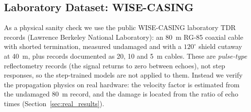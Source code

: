\subsection{Laboratory Dataset: WISE-CASING}
As a physical sanity check we use the public WISE-CASING laboratory TDR records \cite{nrel_wise_casing} (Lawrence Berkeley National Laboratory): an 80~m RG-85 coaxial cable with shorted termination, measured undamaged and with a $120^\circ$ shield cutaway at 40~m, plus records documented as 20, 10 and 5~m cables. These are \emph{pulse-type} reflectometry records (the signal returns to zero between echoes), not step responses, so the step-trained models are not applied to them. Instead we verify the propagation physics on real hardware: the velocity factor is estimated from the undamaged 80~m record, and the damage is located from the ratio of echo times (Section~\ref{sec:real_results}).

